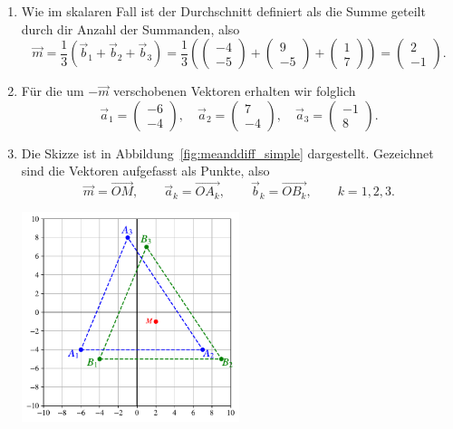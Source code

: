 \begin{losung}
	\begin{enumerate}[label=(\alph*)]
		\item Wie im skalaren Fall ist der Durchschnitt definiert als die Summe geteilt durch dir Anzahl der Summanden, also
		\begin{equation*}
			\vec{m}=\frac{1}{3}\left(\vec{b}_1+\vec{b}_2+\vec{b}_3\right)
			=\frac{1}{3}\left(
			\begin{pmatrix}
				-4 \\
				-5
			\end{pmatrix}+
			\begin{pmatrix}
				9 \\
				-5
			\end{pmatrix}+
			\begin{pmatrix}
				1 \\
				7
			\end{pmatrix}
			\right)
			=
			\begin{pmatrix}
				2 \\
				-1
			\end{pmatrix}.
		\end{equation*}
		\item Für die um $-\vec{m}$ verschobenen Vektoren erhalten wir folglich
		\begin{equation*}
			\vec{a}_1=
			\begin{pmatrix}
				-6 \\
				-4
			\end{pmatrix},\quad
			\vec{a}_2=
			\begin{pmatrix}
				7 \\
				-4
			\end{pmatrix},\quad
			\vec{a}_3=
			\begin{pmatrix}
				-1 \\
				8
			\end{pmatrix}.
		\end{equation*}
		\item Die Skizze ist in Abbildung~\ref{fig:meanddiff_simple} dargestellt.
			Gezeichnet sind die Vektoren aufgefasst als Punkte, also
			\begin{equation*}
				\vec{m}=\overrightarrow{OM},\qquad
				\vec{a}_k=\overrightarrow{OA_k},\qquad
				\vec{b}_k=\overrightarrow{OB_k},\qquad
				k=1,2,3.
			\end{equation*}
			\begin{center}
			\includegraphics[width=0.5\textwidth]{images/facespace/meandiff_simple}

\end{center}
\end{enumerate}
\end{losung}
